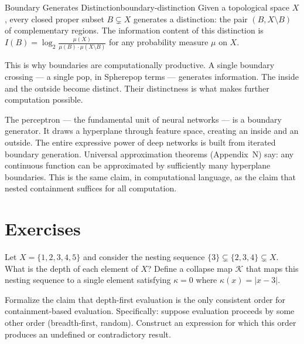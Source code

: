 \begin{proposition}{Boundary Generates Distinction}{boundary-distinction}
  Given a topological space $X$, every closed proper subset $B \subsetneq X$
  generates a distinction: the pair $(B, X \setminus B)$ of complementary
  regions. The information content of this distinction is
  $I(B) = \log_2 \frac{\mu(X)}{\mu(B) \cdot \mu(X \setminus B)}$
  for any probability measure $\mu$ on $X$.
\end{proposition}

This is why boundaries are computationally productive. A single boundary
crossing — a single pop, in Spherepop terms — generates information. The
inside and the outside become distinct. Their distinctness is what makes
further computation possible.

\begin{remark}
  The perceptron — the fundamental unit of neural networks — is a boundary
  generator. It draws a hyperplane through feature space, creating an inside
  and an outside. The entire expressive power of deep networks is built
  from iterated boundary generation. Universal approximation theorems
  (Appendix~N) say: any continuous function can be approximated by
  sufficiently many hyperplane boundaries. This is the same claim, in
  computational language, as the claim that nested containment suffices
  for all computation.
\end{remark}

\section*{Exercises}

\begin{exercise}
  Let $X = \{1, 2, 3, 4, 5\}$ and consider the nesting sequence
  $\{3\} \subsetneq \{2,3,4\} \subsetneq X$.
  What is the depth of each element of $X$? Define a collapse map
  $\mathcal{K}$ that maps this nesting sequence to a single element
  satisfying $\kappa = 0$ where $\kappa(x) = |x - 3|$.
\end{exercise}

\begin{exercise}
  Formalize the claim that depth-first evaluation is the only consistent
  order for containment-based evaluation. Specifically: suppose evaluation
  proceeds by some other order (breadth-first, random). Construct an
  expression for which this order produces an undefined or contradictory
  result.
\end{exercise}


